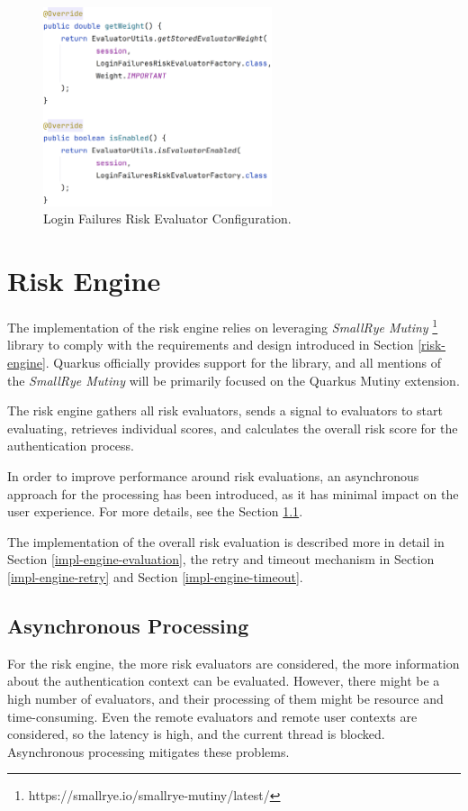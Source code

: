 \begin{figure}[htbp]
  \centering
  \includegraphics[width=0.6\textwidth]{img/sections/6-implementation/loginFailuresConfig.png}
  \caption{Login Failures Risk Evaluator Configuration.}
  \label{fig:impl-risk-evaluator-login-failures-config}
\end{figure}

\newpage
\section{Risk Engine}

The implementation of the risk engine relies on leveraging \textit{SmallRye Mutiny}
\footnote{https://smallrye.io/smallrye-mutiny/latest/} library to comply with the requirements and design introduced in Section \ref{risk-engine}.
Quarkus officially provides support for the library, and all mentions of the \textit{SmallRye Mutiny} will be primarily focused on the Quarkus Mutiny extension.

The risk engine gathers all risk evaluators, sends a signal to evaluators to start evaluating, retrieves individual scores, and calculates the overall risk score for the authentication process.

In order to improve performance around risk evaluations, an asynchronous approach for the processing has been introduced, as it has minimal impact on the user experience.
For more details, see the Section \ref{impl-engine-async}.

The implementation of the overall risk evaluation is described more in detail in Section \ref{impl-engine-evaluation}, the retry and timeout mechanism in Section \ref{impl-engine-retry} and Section \ref{impl-engine-timeout}.

\subsection{Asynchronous Processing} \label{impl-engine-async}
For the risk engine, the more risk evaluators are considered, the more information about the authentication context can be evaluated.
However, there might be a high number of evaluators, and their processing of them might be resource and time-consuming.
Even the remote evaluators and remote user contexts are considered, so the latency is high, and the current thread is blocked.
Asynchronous processing mitigates these problems.

